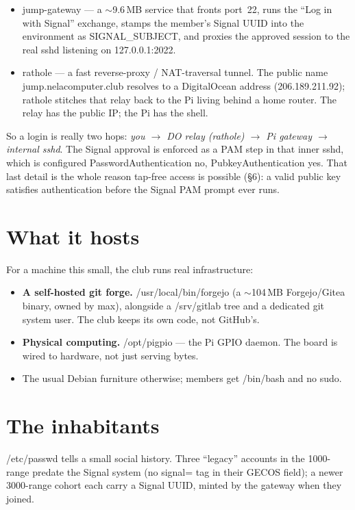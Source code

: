 \documentclass[10pt,letterpaper,twocolumn]{article}
\newcommand{\fp}[1]{{\ttfamily\small\color{acdark}#1}}
\begin{document}
\begin{itemize}
\item \fp{jump-gateway} --- a $\sim$9.6\,MB service that fronts port~22, runs
the ``Log in with Signal'' exchange, stamps the member's Signal UUID into the
environment as \fp{SIGNAL\_SUBJECT}, and proxies the approved session to the
real sshd listening on \fp{127.0.0.1:2022}.
\item \fp{rathole} --- a fast reverse-proxy / NAT-traversal tunnel. The public
name \fp{jump.nelacomputer.club} resolves to a DigitalOcean address
(\fp{206.189.211.92}); \fp{rathole} stitches that relay back to the Pi living
behind a home router. The relay has the public IP; the Pi has the shell.
\end{itemize}

So a login is really two hops: \emph{you $\rightarrow$ DO relay
(rathole) $\rightarrow$ Pi gateway $\rightarrow$ internal sshd}. The Signal
approval is enforced as a PAM step in that inner sshd, which is configured
\fp{PasswordAuthentication no}, \fp{PubkeyAuthentication yes}. That last
detail is the whole reason tap-free access is possible (\S6): a valid public key
satisfies authentication before the Signal PAM prompt ever runs.

\section{What it hosts}

For a machine this small, the club runs real infrastructure:

\begin{itemize}
\item \textbf{A self-hosted git forge.} \fp{/usr/local/bin/forgejo} (a
$\sim$104\,MB Forgejo/Gitea binary, owned by \fp{max}), alongside a
\fp{/srv/gitlab} tree and a dedicated \fp{git} system user. The club keeps
its own code, not GitHub's.
\item \textbf{Physical computing.} \fp{/opt/pigpio} --- the Pi GPIO daemon.
The board is wired to hardware, not just serving bytes.
\item The usual Debian furniture otherwise; members get \fp{/bin/bash} and no
\fp{sudo}.
\end{itemize}

\section{The inhabitants}

\fp{/etc/passwd} tells a small social history. Three ``legacy'' accounts in the
1000-range predate the Signal system (no \fp{signal=} tag in their GECOS
field); a newer 3000-range cohort each carry a Signal UUID, minted by the
gateway when they joined.
\end{document}
